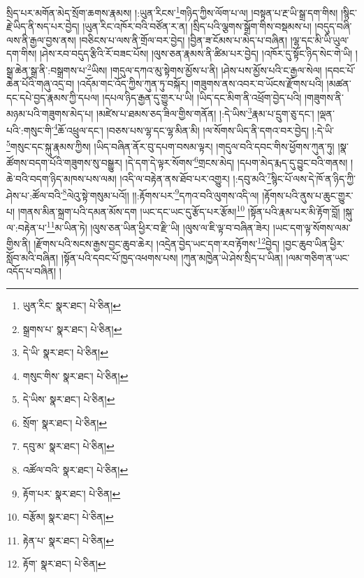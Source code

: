 སྲིད་པར་མགོན་མེད་སྲོག་ཆགས་རྣམས། །:ཡུན་རིངས་\footnote{ཡུན་རིང་  སྣར་ཐང་།  པེ་ཅིན། }གཉིད་ཀྱིས་ལོག་པ་ལ། །བསྟན་པ་རྔ་ཡི་སྒྲ་དག་གིས། །སྙིང་རྗེ་ཡིད་ནི་སད་པར་བྱེད། །ཡུན་རིང་འཁོར་བའི་བཙོན་ར་ན། །སྲིད་པའི་ལྕགས་སྒྲོག་གིས་བསྡམས་པ། །བདུད་བཞི་ལས་ནི་རྒྱལ་བྱས་ནས། །བཅིངས་པ་ལས་ནི་གྲོལ་བར་བྱེད། །བྱིན་ཟ་ངོམས་པ་མེད་པ་བཞིན། །ལྷ་དང་མི་ཡི་ཡུལ་དག་གིས། །ཤེས་རབ་བདུད་རྩིའི་རོ་བཟང་པོས། །ལུས་ཅན་རྣམས་ནི་ཚིམ་པར་བྱེད། །འཁོར་དུ་སྟོང་ཉིད་སེང་གེ་ཡི། །སྒྲ་ཆེན་སྒྲ་ནི་:བསྒྲགས་པ་\footnote{སྒྲགས་པ་  སྣར་ཐང་།  པེ་ཅིན། }ཡིས། །གདུལ་དཀའ་མུ་སྟེགས་མྱོས་པ་ནི། །ཤེས་པས་མྱོས་པའི་ང་རྒྱལ་སེལ། །དབང་པོ་ཆེན་པོའི་གཞུ་འདྲ་བ། །འདོམ་གང་འོད་ཀྱིས་ཀུན་ཏུ་བསྐོར། །གཟུགས་ནས་འབར་བ་ཡོངས་རྫོགས་པའི། །མཚན་དང་དཔེ་བྱད་རྣམས་ཀྱི་དཔལ། །དཔལ་ཉིད་རྒྱན་དུ་གྱུར་པ་ཡི། །ཡིད་དང་མིག་ནི་འཕྲོག་བྱེད་པའི། །གཟུགས་ནི་མཉམ་པའི་གཟུགས་མེད་པ། །མཛེས་པ་ཐམས་ཅད་ཟིལ་གྱིས་གནོན། །:དེ་ཡིས་\footnote{དེ་ཡི་  སྣར་ཐང་།  པེ་ཅིན། }རྣམ་པ་དྲུག་ཅུ་དང་། །ལྡན་པའི་:གསུང་གི་\footnote{གསུང་གིས་  སྣར་ཐང་།  པེ་ཅིན། }ཆོ་འཕྲུལ་དང་། །བཅས་པས་ལྷ་དང་ལྷ་མིན་མི། །ལ་སོགས་ཡིད་ནི་དགའ་བར་བྱེད། །:དེ་ཡི་\footnote{དེ་ཡིས་  སྣར་ཐང་།  པེ་ཅིན། }གསུང་དང་སྐུ་རྣམས་ཀྱིས། །ཡིད་བཞིན་ནོར་བུ་དཔག་བསམ་ལྟར། །གདུལ་བའི་དབང་གིས་ཕྱོགས་ཀུན་ཏུ། །སྣ་ཚོགས་བདག་པོའི་གཟུགས་སུ་བསྒྱུར། །དེ་དག་དེ་ལྟར་སོགས་\footnote{སྲོག་  སྣར་ཐང་།  པེ་ཅིན། }གྲངས་མེད། །དཔག་མེད་རྨད་དུ་བྱུང་བའི་གནས། །ཆེ་བའི་བདག་ཉིད་མཁས་པས་ལམ། །འདི་ལ་བརྟེན་ནས་ཐོབ་པར་འགྱུར། །:དབུ་མའི་\footnote{དབུ་མ་  སྣར་ཐང་།  པེ་ཅིན། }སྙིང་པོ་ལས་དེ་ཁོ་ན་ཉིད་ཀྱི་ཤེས་པ་:ཚོལ་བའི་\footnote{འཚོལ་བའི་  སྣར་ཐང་།  པེ་ཅིན། }ལེའུ་སྟེ་གསུམ་པའོ།། །།:རྟོགས་པར་\footnote{རྟོག་པར་  སྣར་ཐང་།  པེ་ཅིན། }དཀའ་བའི་ལུགས་འདི་ལ། །རྟོགས་པའི་ནུས་པ་ཆུང་གྱུར་པ། །གནས་མིན་སྐྲག་པའི་དམན་མོས་དག །ཡང་དང་ཡང་དུ་རྩོད་པར་རྩོམ།\footnote{བརྩོམ།  སྣར་ཐང་།  པེ་ཅིན། } །སྟོན་པའི་རྣམ་པར་མི་རྟོག་བློ། །སྐུ་ལ་:བརྟེན་པ་\footnote{རྟེན་པ་  སྣར་ཐང་།  པེ་ཅིན། }མ་ཡིན་ཏེ། །ལུས་ཅན་ཡིན་ཕྱིར་བ་རྫི་ཡི། །ལུས་ལ་ཇི་ལྟ་བ་བཞིན་ཟེར། །ཡང་དག་ལྟ་སོགས་ལམ་གྱིས་ནི། །རྫོགས་པའི་སངས་རྒྱས་བྱང་ཆུབ་ཆེར། །འདྲེན་བྱེད་ཡང་དག་རབ་རྟོགས་\footnote{རྟོག་  སྣར་ཐང་།  པེ་ཅིན། }བྱེད། །བྱང་ཆུབ་ཡིན་ཕྱིར་སློབ་མའི་བཞིན། །སྟོན་པའི་དབང་པོ་ཁྱད་འཕགས་པས། །ཀུན་མཁྱེན་ཡེ་ཤེས་སྲིད་པ་ཡིན། །ལམ་གཅིག་ན་ཡང་འདོད་པ་བཞིན། །
